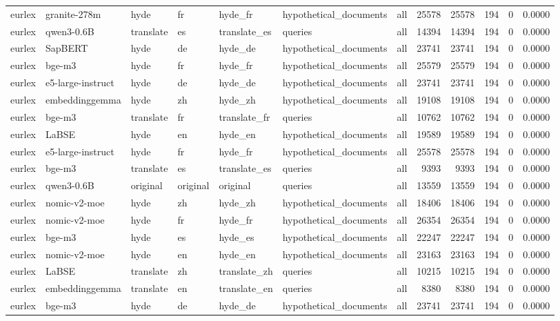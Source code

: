 \begin{tabular}{lllllllrrrrr}
eurlex & granite-278m & hyde & fr & hyde\_fr & hypothetical\_documents & all & 25578 & 25578 & 194 & 0 & 0.0000 \\
eurlex & qwen3-0.6B & translate & es & translate\_es & queries & all & 14394 & 14394 & 194 & 0 & 0.0000 \\
eurlex & SapBERT & hyde & de & hyde\_de & hypothetical\_documents & all & 23741 & 23741 & 194 & 0 & 0.0000 \\
eurlex & bge-m3 & hyde & fr & hyde\_fr & hypothetical\_documents & all & 25579 & 25579 & 194 & 0 & 0.0000 \\
eurlex & e5-large-instruct & hyde & de & hyde\_de & hypothetical\_documents & all & 23741 & 23741 & 194 & 0 & 0.0000 \\
eurlex & embeddinggemma & hyde & zh & hyde\_zh & hypothetical\_documents & all & 19108 & 19108 & 194 & 0 & 0.0000 \\
eurlex & bge-m3 & translate & fr & translate\_fr & queries & all & 10762 & 10762 & 194 & 0 & 0.0000 \\
eurlex & LaBSE & hyde & en & hyde\_en & hypothetical\_documents & all & 19589 & 19589 & 194 & 0 & 0.0000 \\
eurlex & e5-large-instruct & hyde & fr & hyde\_fr & hypothetical\_documents & all & 25578 & 25578 & 194 & 0 & 0.0000 \\
eurlex & bge-m3 & translate & es & translate\_es & queries & all & 9393 & 9393 & 194 & 0 & 0.0000 \\
eurlex & qwen3-0.6B & original & original & original & queries & all & 13559 & 13559 & 194 & 0 & 0.0000 \\
eurlex & nomic-v2-moe & hyde & zh & hyde\_zh & hypothetical\_documents & all & 18406 & 18406 & 194 & 0 & 0.0000 \\
eurlex & nomic-v2-moe & hyde & fr & hyde\_fr & hypothetical\_documents & all & 26354 & 26354 & 194 & 0 & 0.0000 \\
eurlex & bge-m3 & hyde & es & hyde\_es & hypothetical\_documents & all & 22247 & 22247 & 194 & 0 & 0.0000 \\
eurlex & nomic-v2-moe & hyde & en & hyde\_en & hypothetical\_documents & all & 23163 & 23163 & 194 & 0 & 0.0000 \\
eurlex & LaBSE & translate & zh & translate\_zh & queries & all & 10215 & 10215 & 194 & 0 & 0.0000 \\
eurlex & embeddinggemma & translate & en & translate\_en & queries & all & 8380 & 8380 & 194 & 0 & 0.0000 \\
eurlex & bge-m3 & hyde & de & hyde\_de & hypothetical\_documents & all & 23741 & 23741 & 194 & 0 & 0.0000 \\

\end{tabular}

